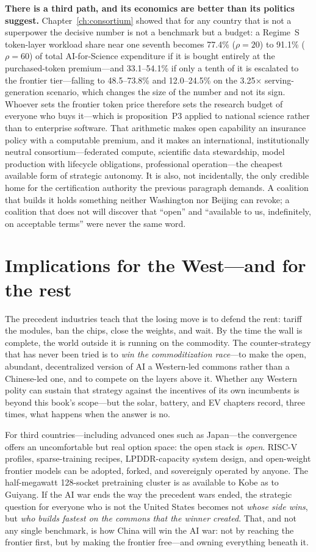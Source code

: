 \textbf{There is a third path, and its economics are better than its politics suggest.} Chapter~\ref{ch:consortium} showed that for any country that is not a superpower the decisive number is not a benchmark but a budget: a Regime~S token-layer workload share near one seventh becomes 77.4\% ($\rho=20$) to 91.1\% ($\rho=60$) of total AI-for-Science expenditure if it is bought entirely at the purchased-token premium---and 33.1--54.1\% if only a tenth of it is escalated to the frontier tier---falling to 48.5--73.8\% and 12.0--24.5\% on the 3.25$\times$ serving-generation scenario, which changes the size of the number and not its sign. Whoever sets the frontier token price therefore sets the research budget of everyone who buys it---which is proposition~P3 applied to national science rather than to enterprise software. That arithmetic makes open capability an insurance policy with a computable premium, and it makes an international, institutionally neutral consortium---federated compute, scientific data stewardship, model production with lifecycle obligations, professional operation---the cheapest available form of strategic autonomy. It is also, not incidentally, the only credible home for the certification authority the previous paragraph demands. A coalition that builds it holds something neither Washington nor Beijing can revoke; a coalition that does not will discover that ``open'' and ``available to us, indefinitely, on acceptable terms'' were never the same word.

\section{Implications for the West---and for the rest}

The precedent industries teach that the losing move is to defend the rent: tariff the modules, ban the chips, close the weights, and wait. By the time the wall is complete, the world outside it is running on the commodity. The counter-strategy that has never been tried is to \emph{win the commoditization race}---to make the open, abundant, decentralized version of AI a Western-led commons rather than a Chinese-led one, and to compete on the layers above it. Whether any Western polity can sustain that strategy against the incentives of its own incumbents is beyond this book's scope---but the solar, battery, and EV chapters record, three times, what happens when the answer is no.

For third countries---including advanced ones such as Japan---the convergence offers an uncomfortable but real option space: the open stack is \emph{open}. RISC-V profiles, sparse-training recipes, LPDDR-capacity system design, and open-weight frontier models can be adopted, forked, and sovereignly operated by anyone. The half-megawatt 128-socket pretraining cluster is as available to Kobe as to Guiyang. If the AI war ends the way the precedent wars ended, the strategic question for everyone who is not the United States becomes not \emph{whose side wins}, but \emph{who builds fastest on the commons that the winner created}. That, and not any single benchmark, is how China will win the AI war: not by reaching the frontier first, but by making the frontier free---and owning everything beneath it.

